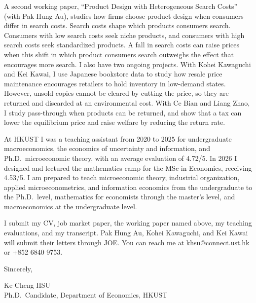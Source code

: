 \documentclass[11pt]{article}
\begin{document}
A second working paper, ``Product Design with Heterogeneous Search Costs'' (with Pak Hung Au), studies how firms choose product design when consumers differ in search costs. Search costs shape which products consumers search. Consumers with low search costs seek niche products, and consumers with high search costs seek standardized products. A fall in search costs can raise prices when this shift in which product consumers search outweighs the effect that encourages more search. I also have two ongoing projects. With Kohei Kawaguchi and Kei Kawai, I use Japanese bookstore data to study how resale price maintenance encourages retailers to hold inventory in low-demand states. However, unsold copies cannot be cleared by cutting the price, so they are returned and discarded at an environmental cost. With Ce Bian and Liang Zhao, I study pass-through when products can be returned, and show that a tax can lower the equilibrium price and raise welfare by reducing the return rate.

At HKUST I was a teaching assistant from 2020 to 2025 for undergraduate macroeconomics, the economics of uncertainty and information, and Ph.D.\ microeconomic theory, with an average evaluation of 4.72/5. In 2026 I designed and lectured the mathematics camp for the MSc in Economics, receiving 4.53/5. I am prepared to teach microeconomic theory, industrial organization, applied microeconometrics, and information economics from the undergraduate to the Ph.D.\ level, mathematics for economists through the master's level, and macroeconomics at the undergraduate level.

I submit my CV, job market paper, the working paper named above, my teaching evaluations, and my transcript. Pak Hung Au, Kohei Kawaguchi, and Kei Kawai will submit their letters through JOE. You can reach me at khsu@connect.ust.hk or +852 6840 9753.

\vspace{0.22em}
Sincerely,

\vspace{0.22em}
Ke Cheng HSU \\
Ph.D.\ Candidate, Department of Economics, HKUST
\end{document}
